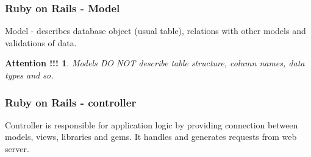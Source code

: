 \documentclass{beamer}
\theoremstyle{mystyle}
\newtheorem*{attention}{Attention !!!}
\begin{document}
\begin{frame}
  \frametitle{Ruby on Rails - Model}
  \begin{definition}
    Model - describes database object (usual table), relations with other
    models and validations of data.
  \end{definition}
  \begin{example}[user.rb]
    \modelexample
  \end{example}
  \begin{attention}
    \alert{Models DO NOT} describe table structure, column names, data types and so.
  \end{attention}
\end{frame}

\begin{frame}
  \frametitle{Ruby on Rails - controller}
  \begin{definition}
    Controller is responsible for application logic by providing connection
    between models, views, libraries and gems.
    It handles and generates requests from web server.
  \end{definition}
  
\end{frame}
\end{document}
